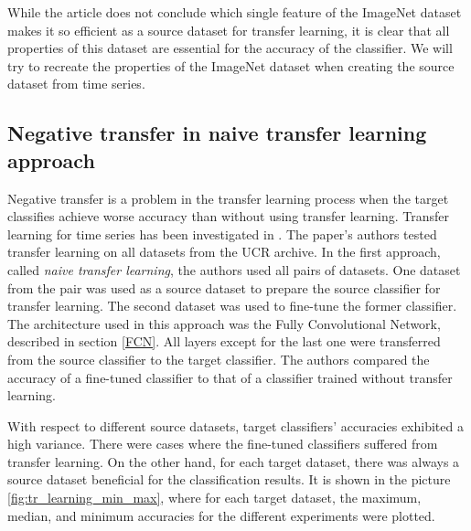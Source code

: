 \documentclass[a4paper,11pt,twoside]{report}
\theoremstyle{definition}
\begin{document}
While the article \cite{imagnet} does not conclude which single feature of the ImageNet dataset makes it so efficient as a source dataset for transfer learning, it is clear that all properties of this dataset are essential for the accuracy of the classifier. We will try to recreate the properties of the ImageNet dataset when creating the source dataset from time series.



\subsection{Negative transfer in naive transfer learning approach}\label{Negative_transfer}
Negative transfer is a problem in the transfer learning process when the target classifies achieve worse accuracy than without using transfer learning. Transfer learning for time series has been investigated in \cite{transfer_learning_time_series}. The paper's authors tested transfer learning on all datasets from the UCR archive. In the first approach, called \textit{naive transfer learning}, the authors used all pairs of datasets. One dataset from the pair was used as a source dataset to prepare the source classifier for transfer learning. The second dataset was used to fine-tune the former classifier. The architecture used in this approach was the Fully Convolutional Network, described in section \ref{FCN}.  All layers except for the last one were transferred from the source classifier to the target classifier. The authors compared the accuracy of a fine-tuned classifier to that of a classifier trained without transfer learning.

With respect to different source datasets, target classifiers' accuracies exhibited a high variance. There were cases where the fine-tuned classifiers suffered from transfer learning. On the other hand, for each target dataset, there was always a source dataset beneficial for the classification results. It is shown in the picture \ref{fig:tr_learning_min_max}, where for each target dataset, the maximum, median, and minimum accuracies for the different experiments were plotted.

\FloatBarrier
\end{document}
